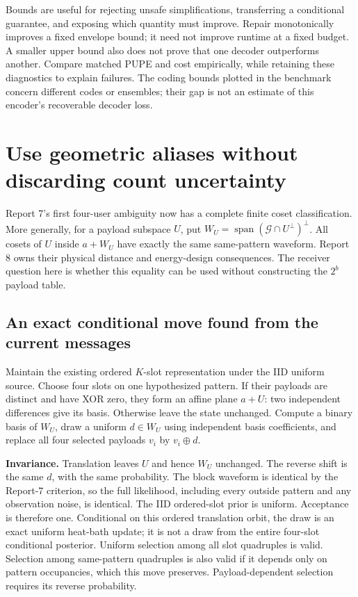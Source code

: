 \documentclass[10pt,a4paper]{article}
\begin{document}
Bounds are useful for rejecting unsafe simplifications, transferring a conditional guarantee,
and exposing which quantity must improve. Repair monotonically improves a fixed envelope bound;
it need not improve runtime at a fixed budget. A smaller upper bound also does not prove that one
decoder outperforms another. Compare matched PUPE and cost empirically, while retaining these
diagnostics to explain failures. The coding bounds plotted in the benchmark concern different codes
or ensembles; their gap is not an estimate of this encoder's recoverable decoder loss.

\section{Use geometric aliases without discarding count uncertainty}
\label{sec:affine-alias-update}
Report 7's first four-user ambiguity now has a complete finite coset classification. More generally,
for a payload subspace $U$, put
$W_U=\operatorname{span}(\mathcal G\cap U^\perp)^\perp$.
All cosets of $U$ inside $a+W_U$ have exactly the same same-pattern waveform.
Report 8 owns their physical distance and energy-design consequences. The receiver question here is
whether this equality can be used without constructing the $2^b$ payload table.

\subsection{An exact conditional move found from the current messages}
Maintain the existing ordered $K$-slot representation under the IID uniform source. Choose four slots
on one hypothesized pattern. If their payloads are distinct and have XOR zero, they form an affine
plane $a+U$: two independent differences give its basis. Otherwise leave the state unchanged.
Compute a binary basis of $W_U$, draw a uniform $d\in W_U$ using independent basis coefficients,
and replace all four selected payloads $v_i$ by $v_i\oplus d$.

\textbf{Invariance.} Translation leaves $U$ and hence $W_U$ unchanged. The reverse shift is the same
$d$, with the same probability. The block waveform is identical by the Report-7 criterion, so the
full likelihood, including every outside pattern and any observation noise, is identical. The IID
ordered-slot prior is uniform. Acceptance is therefore one. Conditional on this ordered translation
orbit, the draw is an exact uniform heat-bath update; it is not a draw from the entire four-slot
conditional posterior. Uniform selection among all slot quadruples is valid. Selection among
same-pattern quadruples is also valid if it depends only on pattern occupancies, which this move preserves.
Payload-dependent selection requires its reverse probability.
\end{document}
